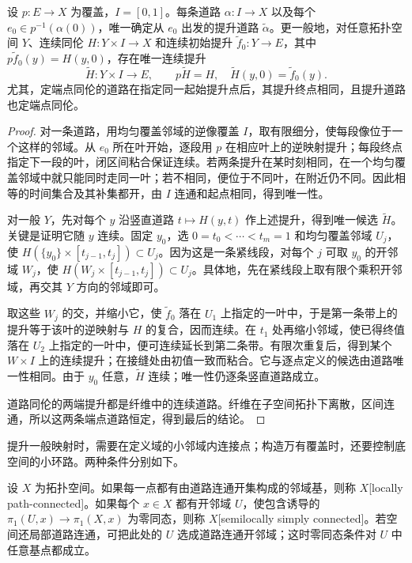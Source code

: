 \begin{theorem}[道路提升与同伦提升]\label{g2:thm:covering-lifts}
	设 \(p:E\rightarrow X\) 为覆盖，\(I=[0,1]\)。每条道路 \(\alpha:I\rightarrow X\) 以及每个 \(e_0\in p^{-1}(\alpha(0))\)，唯一确定从 \(e_0\) 出发的提升道路 \(\widetilde\alpha\)。更一般地，对任意拓扑空间 \(Y\)、连续同伦 \(H:Y\times I\rightarrow X\) 和连续初始提升 \(\widetilde f_0:Y\rightarrow E\)，其中 \(p\widetilde f_0(y)=H(y,0)\)，存在唯一连续提升
	\[
		\widetilde H:Y\times I\longrightarrow E,\qquad
		p\widetilde H=H,\quad \widetilde H(y,0)=\widetilde f_0(y).
	\]
	尤其，定端点同伦的道路在指定同一起始提升点后，其提升终点相同，且提升道路也定端点同伦。
\end{theorem}
\begin{proof}
	对一条道路，用均匀覆盖邻域的逆像覆盖 \(I\)，取有限细分，使每段像位于一个这样的邻域。从 \(e_0\) 所在叶开始，逐段用 \(p\) 在相应叶上的逆映射提升；每段终点指定下一段的叶，闭区间粘合保证连续。若两条提升在某时刻相同，在一个均匀覆盖邻域中就只能同时走同一叶；若不相同，便位于不同叶，在附近仍不同。因此相等的时间集合及其补集都开，由 \(I\) 连通和起点相同，得到唯一性。

	对一般 \(Y\)，先对每个 \(y\) 沿竖直道路 \(t\mapsto H(y,t)\) 作上述提升，得到唯一候选 \(\widetilde H\)。关键是证明它随 \(y\) 连续。固定 \(y_0\)，选 \(0=t_0<\cdots<t_m=1\) 和均匀覆盖邻域 \(U_j\)，使 \(H(\{y_0\}\times[t_{j-1},t_j])\subset U_j\)。因为这是一条紧线段，对每个 \(j\) 可取 \(y_0\) 的开邻域 \(W_j\)，使 \(H(W_j\times[t_{j-1},t_j])\subset U_j\)。具体地，先在紧线段上取有限个乘积开邻域，再交其 \(Y\) 方向的邻域即可。

	取这些 \(W_j\) 的交，并缩小它，使 \(\widetilde f_0\) 落在 \(U_1\) 上指定的一叶中，于是第一条带上的提升等于该叶的逆映射与 \(H\) 的复合，因而连续。在 \(t_1\) 处再缩小邻域，使已得终值落在 \(U_2\) 上指定的一叶中，便可连续延长到第二条带。有限次重复后，得到某个 \(W\times I\) 上的连续提升；在接缝处由初值一致而粘合。它与逐点定义的候选由道路唯一性相同。由于 \(y_0\) 任意，\(\widetilde H\) 连续；唯一性仍逐条竖直道路成立。

	道路同伦的两端提升都是纤维中的连续道路。纤维在子空间拓扑下离散，区间连通，所以这两条端点道路恒定，得到最后的结论。
\end{proof}

提升一般映射时，需要在定义域的小邻域内连接点；构造万有覆盖时，还要控制底空间的小环路。两种条件分别如下。

\begin{definition}\label{g2:def:local-covering-conditions}
	设 \(X\) 为拓扑空间。如果每一点都有由道路连通开集构成的邻域基，则称 \(X\)[locally path-connected]。如果每个 \(x\in X\) 都有开邻域 \(U\)，使包含诱导的 \(\pi_1(U,x)\rightarrow\pi_1(X,x)\) 为零同态，则称 \(X\)[semilocally simply connected]。若空间还局部道路连通，可把此处的 \(U\) 选成道路连通开邻域；这时零同态条件对 \(U\) 中任意基点都成立。
\end{definition}

